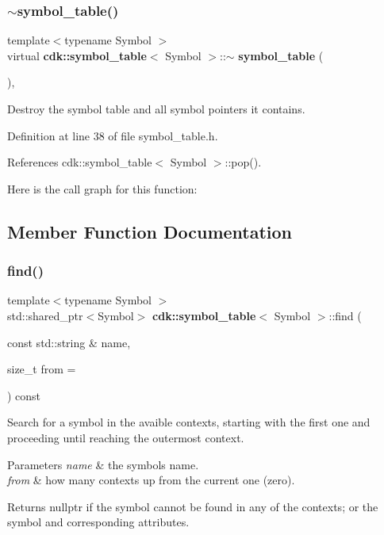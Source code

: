 \subsubsection{$\sim$symbol\+\_\+table()}
{\footnotesize\ttfamily template$<$typename Symbol $>$ \\
virtual \textbf{ cdk\+::symbol\+\_\+table}$<$ Symbol $>$\+::$\sim$\textbf{ symbol\+\_\+table} (\begin{DoxyParamCaption}{ }\end{DoxyParamCaption})\hspace{0.3cm}{\ttfamily [inline]}, {\ttfamily [virtual]}}

Destroy the symbol table and all symbol pointers it contains. 

Definition at line 38 of file symbol\+\_\+table.\+h.



References cdk\+::symbol\+\_\+table$<$ Symbol $>$\+::pop().

Here is the call graph for this function\+:


\subsection{Member Function Documentation}
\mbox{\label{classcdk_1_1symbol__table_a0ba53541f7eefdad36bfc88097eb30f4}} 
\subsubsection{find()}
{\footnotesize\ttfamily template$<$typename Symbol $>$ \\
std\+::shared\+\_\+ptr$<$Symbol$>$ \textbf{ cdk\+::symbol\+\_\+table}$<$ Symbol $>$\+::find (\begin{DoxyParamCaption}\item[{const std\+::string \&}]{name,  }\item[{size\+\_\+t}]{from = {} }\end{DoxyParamCaption}) const\hspace{0.3cm}{\ttfamily [inline]}}

Search for a symbol in the avaible contexts, starting with the first one and proceeding until reaching the outermost context.


\begin{DoxyParams}{Parameters}
{\em name} & the symbol\textquotesingle{}s name. \\
\hline
{\em from} & how many contexts up from the current one (zero). \\
\hline
\end{DoxyParams}
\begin{DoxyReturn}{Returns}
{\ttfamily nullptr} if the symbol cannot be found in any of the contexts; or the symbol and corresponding attributes. 
\end{DoxyReturn}


